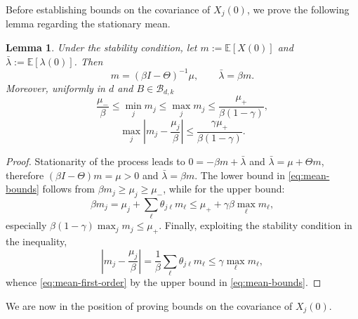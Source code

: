 \documentclass{article}
\newtheorem{lemma}{Lemma}[section]
\newcommand{\E}{\mathbb{E}}
\begin{document}
Before establishing bounds on the covariance of $X_j(0)$, we prove the following lemma regarding the stationary mean.
\begin{lemma}
\label{lem:stability_stationarymean_momen}
Under the stability condition, let $m:=\E[X(0)]$ and $\bar\lambda:=\E[\lambda(0)]$. Then 
\[
    m=(\beta I-\Theta)^{-1}\mu, \qquad \bar \lambda =\beta m.
\]
Moreover, uniformly in $d$ and $B\in\mathcal B_{d,k}$
    \begin{equation}
        \label{eq:mean-bounds}
        \frac{\mu_-}{\beta}
        \le
        \min_j m_j
        \le
        \max_j m_j
        \le
        \frac{\mu_+}{\beta(1-\gamma)},
    \end{equation}
    \begin{equation}
    \label{eq:mean-first-order}
        \max_j\left|m_j-\frac{\mu_j}{\beta}\right|
        \le
        \frac{\gamma\mu_+}{\beta(1-\gamma)}.
    \end{equation}

\end{lemma}
\begin{proof}
Stationarity of the process leads to $0=-\beta m+\bar\lambda$ and $\bar\lambda=\mu+\Theta m$, therefore $(\beta I-\Theta)m=\mu>0$ and $\bar\lambda=\beta m$. The lower bound in \eqref{eq:mean-bounds} follows from $\beta m_j\ge \mu_j\ge \mu_-$, while for the upper bound:
\[
\beta m_j=\mu_j+\sum_\ell\theta_{j\ell}m_\ell
\le \mu_+ + \gamma \beta\max_\ell m_\ell,
\]
especially $\beta(1-\gamma)\max_j m_j\le \mu_+$. Finally, exploiting the stability condition in the inequality,
\[
    \left|m_j-\frac{\mu_j}{\beta}\right|=\frac{1}{\beta}\sum_\ell \theta_{j\ell}m_\ell \leq \gamma \max_\ell m_\ell ,
\]
whence \eqref{eq:mean-first-order} by the upper bound in \eqref{eq:mean-bounds}.
\end{proof}


We are now in the position of proving bounds on the covariance of $X_j(0)$. 
\end{document}
